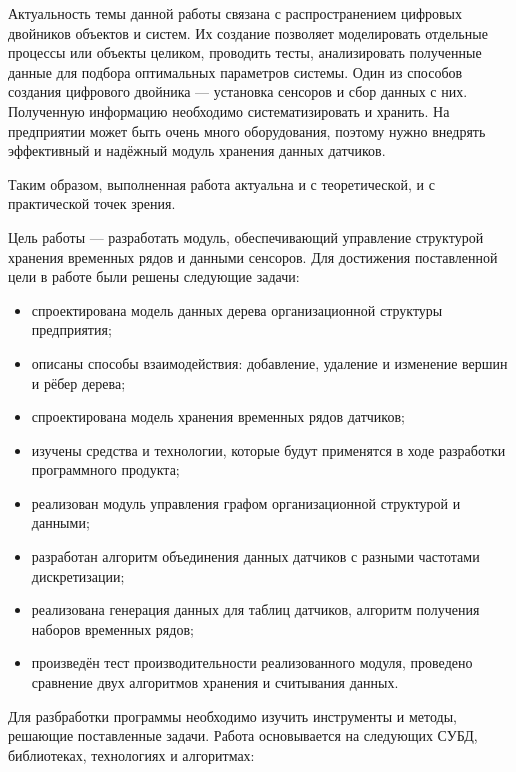 \introduction %

Актуальность темы данной работы связана с распространением цифровых двойников объектов и систем. Их создание позволяет моделировать отдельные процессы или объекты целиком, проводить тесты, анализировать полученные данные для подбора оптимальных параметров системы. Один из способов создания цифрового двойника — установка сенсоров и сбор данных с них. Полученную информацию необходимо систематизировать и хранить. На предприятии может быть очень много оборудования, поэтому нужно внедрять эффективный и надёжный модуль хранения данных датчиков.

Таким образом, выполненная работа актуальна и с теоретической, и с практической точек зрения.

Цель работы --- разработать модуль, обеспечивающий управление структурой хранения временных рядов и данными сенсоров. Для достижения поставленной цели в работе были решены следующие задачи:

\begin{itemize}
    \item спроектирована модель данных дерева организационной структуры предприятия;
    \item описаны способы взаимодействия: добавление, удаление и изменение вершин и рёбер дерева;
    \item спроектирована модель хранения временных рядов датчиков;
    \item изучены средства и технологии, которые будут применятся в ходе разработки программного продукта;
    \item реализован модуль управления графом организационной структурой и данными;
    \item разработан алгоритм объединения данных датчиков с разными частотами дискретизации;
    \item реализована генерация данных для таблиц датчиков, алгоритм получения наборов временных рядов;
    \item произведён тест производительности реализованного модуля, проведено сравнение двух алгоритмов хранения и считывания данных.
\end{itemize}

Для разбработки программы необходимо изучить инструменты и методы, решающие поставленные задачи. Работа основывается на следующих СУБД, библиотеках, технологиях и алгоритмах:

